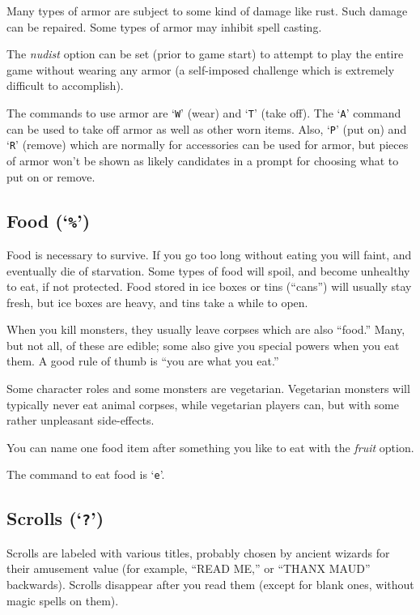Many types of armor are subject to some kind of damage like rust.  Such
damage can be repaired.  Some types of armor may inhibit spell casting.

The {\it nudist\/}
option can be set (prior to game start) to attempt to play the entire
game without wearing any armor (a self-imposed challenge which is
extremely difficult to accomplish).

The commands to use armor are `{\tt W}' (wear) and `{\tt T}' (take off).
The `{\tt A}' command can be used to take off armor as well as other
worn items.
Also, `{\tt P}' (put on) and `{\tt R}' (remove) which are normally for
accessories can be used for armor, but pieces of armor won't be shown
as likely candidates in a prompt for choosing what to put on or remove.

\subsection*{Food (`{\tt \%}')}

Food is necessary to survive.  If you go too long without eating you
will faint, and eventually die of starvation.
Some types of food will spoil, and become unhealthy to eat,
if not protected.
Food stored in ice boxes or tins (``cans'')
will usually stay fresh, but ice boxes are heavy, and tins
take a while to open.

When you kill monsters, they usually leave corpses which are also
``food.''  Many, but not all, of these are edible; some also give you
special powers when you eat them.  A good rule of thumb is ``you are
what you eat.''

Some character roles and some monsters are vegetarian.  Vegetarian monsters
will typically never eat animal corpses, while vegetarian players can,
but with some rather unpleasant side-effects.

You can name one food item after something you like to eat with the
{\it fruit\/} option.

The command to eat food is `{\tt e}'.

\subsection*{Scrolls (`{\tt ?}')}

Scrolls are labeled with various titles, probably chosen by ancient wizards
for their amusement value (for example, ``READ ME,'' or ``THANX MAUD'' backwards).
Scrolls disappear after you read them (except for blank ones, without
magic spells on them).

